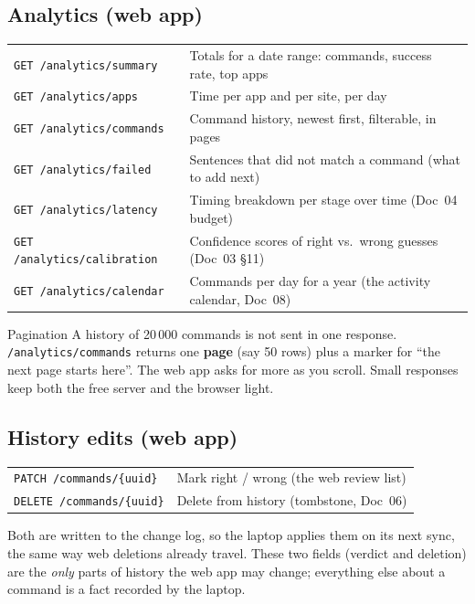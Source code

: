 \documentclass[11pt,a4paper]{article}
\begin{document}
\subsection{Analytics (web app)}
\begin{center}
\renewcommand{\arraystretch}{1.15}
\begin{tabularx}{\textwidth}{l X}
\toprule
\texttt{GET /analytics/summary}     & Totals for a date range: commands, success rate, top apps \\
\texttt{GET /analytics/apps}        & Time per app and per site, per day \\
\texttt{GET /analytics/commands}    & Command history, newest first, filterable, in pages \\
\texttt{GET /analytics/failed}      & Sentences that did not match a command (what to add next) \\
\texttt{GET /analytics/latency}     & Timing breakdown per stage over time (Doc~04 budget) \\
\texttt{GET /analytics/calibration} & Confidence scores of right vs.\ wrong guesses (Doc~03 \S11) \\
\texttt{GET /analytics/calendar}    & Commands per day for a year (the activity calendar, Doc~08) \\
\bottomrule
\end{tabularx}
\end{center}

\begin{concept}{Pagination}
A history of 20\,000 commands is not sent in one response. \texttt{/analytics/commands}
returns one \textbf{page} (say 50 rows) plus a marker for ``the next page starts here''. The web
app asks for more as you scroll. Small responses keep both the free server and the browser
light.
\end{concept}

\subsection{History edits (web app)}
\begin{center}
\renewcommand{\arraystretch}{1.15}
\begin{tabularx}{\textwidth}{l X}
\toprule
\texttt{PATCH /commands/\{uuid\}}  & Mark right / wrong (the web review list) \\
\texttt{DELETE /commands/\{uuid\}} & Delete from history (tombstone, Doc~06) \\
\bottomrule
\end{tabularx}
\end{center}
\noindent Both are written to the change log, so the laptop applies them on its next sync, the
same way web deletions already travel. These two fields (verdict and deletion) are the
\emph{only} parts of history the web app may change; everything else about a command is a fact
recorded by the laptop.
\end{document}
